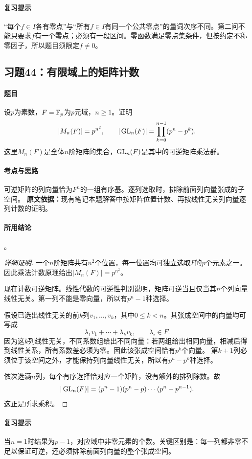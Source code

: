 \paragraph{复习提示}
“每个$f\in I$各有零点”与“所有$f\in I$有同一个公共零点”的量词次序不同。第二问不能只要求$f$有一个零点；必须有一段区间。零函数满足零点集条件，但按约定不称零因子，所以题目须限定$f\ne0$。

\subsection{习题44：有限域上的矩阵计数}
\paragraph{题目}
设$p$为素数，$F=\mathbb F_p$为$p$元域，$n\geq1$。证明
\[
|M_n(F)|=p^{n^2},\qquad
|\operatorname{GL}_n(F)|=\prod_{k=0}^{n-1}(p^n-p^k).
\]
这里$M_n(F)$是全体$n$阶矩阵的集合，$\operatorname{GL}_n(F)$是其中的可逆矩阵乘法群。
\paragraph{考点与思路}
可逆矩阵的列向量恰为$F^n$的一组有序基。逐列选取时，排除前面列向量张成的子空间。
\textbf{原文依据：}现有笔记本题解答中按矩阵位置计数、再按线性无关列向量逐列计数的证明。
\paragraph{所用结论}
。
\begin{proof}[详细证明]
一个$n$阶矩阵共有$n^2$个位置，每一位置均可独立选取$F$的$p$个元素之一。因此乘法计数原理给出$|M_n(F)|=p^{n^2}$。

现在计数可逆矩阵。线性代数的可逆性判别说明，矩阵可逆当且仅当其$n$个列向量线性无关。第一列不能是零向量，所以有$p^n-1$种选择。

假设已选出线性无关的前$k$列$v_1,\ldots,v_k$，其中$0\leq k<n$。其张成空间中的向量均可写成
\[
\lambda_1v_1+\cdots+\lambda_kv_k,\qquad \lambda_i\in F.
\]
因为这$k$列线性无关，不同系数组给出不同向量：若两组给出相同向量，相减后得到线性关系，所有系数差必须为零。因此该张成空间恰有$p^k$个向量。
第$k+1$列必须位于该空间之外，才能保持列向量线性无关，所以有$p^n-p^k$种选择。

依次选满$n$列，每个有序选择恰对应一个矩阵，没有额外的排列除数。故
\[
|\operatorname{GL}_n(F)|=(p^n-1)(p^n-p)\cdots(p^n-p^{n-1}).
\]
这正是所求乘积。
\end{proof}
\paragraph{复习提示}
当$n=1$时结果为$p-1$，对应域中非零元素的个数。关键区别是：每一列都非零不足以保证可逆，还必须排除前面列向量的整个张成空间。
